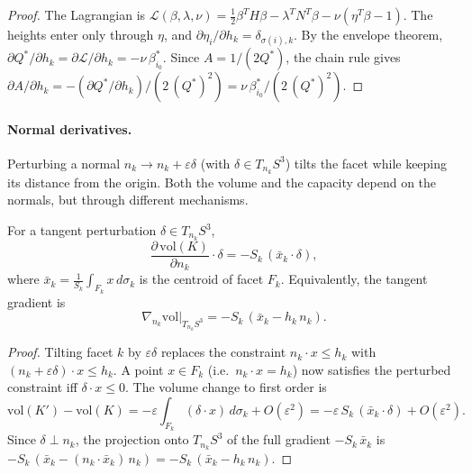 \begin{proof}
The Lagrangian is
$\mathcal{L}(\beta,\lambda,\nu) = \tfrac{1}{2}\beta^T H\beta - \lambda^T N^T\beta - \nu(\eta^T\beta - 1)$.
The heights enter only through $\eta$, and $\partial\eta_i/\partial h_k = \delta_{\sigma(i),k}$.
By the envelope theorem,
$\partial Q^*/\partial h_k = \partial\mathcal{L}/\partial h_k = -\nu\,\beta_{i_0}^*$.
Since $A = 1/(2Q^*)$, the chain rule gives
$\partial A/\partial h_k = -(\partial Q^*/\partial h_k) / (2\,(Q^*)^2) = \nu\,\beta_{i_0}^* / (2\,(Q^*)^2)$.
\end{proof}

\paragraph{Normal derivatives.}

Perturbing a normal $n_k \to n_k + \varepsilon\delta$ (with $\delta \in T_{n_k}S^3$)
tilts the facet while keeping its distance from the origin.
Both the volume and the capacity depend on the normals, but through different mechanisms.

\begin{lemma}
\label{lem:vol-derivative-normal}
For a tangent perturbation $\delta \in T_{n_k}S^3$,
\[
  \frac{\partial\,\mathrm{vol}(K)}{\partial n_k} \cdot \delta
  = -S_k\,(\bar{x}_k \cdot \delta),
\]
where $\bar{x}_k = \frac{1}{S_k}\int_{F_k} x\,d\sigma_k$ is the
centroid of facet $F_k$.
Equivalently, the tangent gradient is
\[
  \nabla_{n_k}\mathrm{vol}\big|_{T_{n_k}S^3}
  = -S_k\,(\bar{x}_k - h_k\,n_k).
\]
\end{lemma}

\begin{proof}
Tilting facet $k$ by $\varepsilon\delta$ replaces the constraint
$n_k \cdot x \le h_k$ with $(n_k + \varepsilon\delta) \cdot x \le h_k$.
A point $x \in F_k$ (i.e.\ $n_k \cdot x = h_k$) now satisfies the
perturbed constraint iff $\delta \cdot x \le 0$.
The volume change to first order is
\[
  \mathrm{vol}(K') - \mathrm{vol}(K)
  = -\varepsilon \int_{F_k} (\delta \cdot x)\,d\sigma_k + O(\varepsilon^2)
  = -\varepsilon\,S_k\,(\bar{x}_k \cdot \delta) + O(\varepsilon^2).
\]
Since $\delta \perp n_k$, the projection onto $T_{n_k}S^3$ of the
full gradient $-S_k\,\bar{x}_k$ is $-S_k\,(\bar{x}_k - (n_k \cdot \bar{x}_k)\,n_k)
= -S_k\,(\bar{x}_k - h_k\,n_k)$.
\end{proof}


